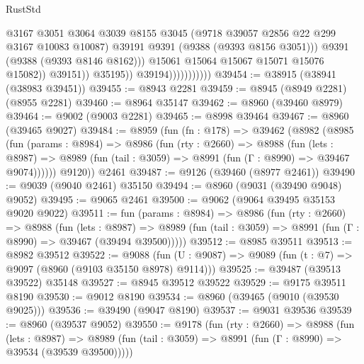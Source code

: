 \begin{lexlean}{RustStd}
\begin{coremodule}
                                          @3167
                                          @3051
                                          @3064
                                          @3039
                                          @8155
                                          @3045
                                          (@9718 @39057 @2856 @22 @299 @3167 @10083 @10087)
                                          @39191
                                          @9391
                                          (@9388 (@9393 @8156 @3051)))
                                        @9391
                                        (@9388 (@9393 @8146 @8162)))
                                      @15061
                                      @15064
                                      @15067
                                      @15071
                                      @15076
                                      @15082))
                                  @39151))
                              @35195))
                          @39194)))))))))))
@39454 := @38915 (@38941 (@38983 @39451))
@39455 := @8943 @2281
@39459 := @8945 (@8949 @2281) (@8955 @2281)
@39460 := @8964 @35147
@39462 := @8960 (@39460 @8979)
@39464 := @9002 (@9003 @2281)
@39465 := @8998 @39464
@39467 := @8960 (@39465 @9027)
@39484 := @8959
    (fun (fn : @178) =>
    @39462
      (@8982
        (@8985
          (fun (params : @8984) =>
          @8986
            (fun (rty : @2660) =>
            @8988
              (fun (lets : @8987) =>
              @8989 (fun (tail : @3059) => @8991 (fun (Γ : @8990) => @39467 @9074))))))
        @9120))
    @2461
@39487 := @9126 (@39460 (@8977 @2461))
@39490 := @9039 (@9040 @2461) @35150
@39494 := @8960 (@9031 (@39490 @9048) @9052)
@39495 := @9065 @2461
@39500 := @9062 (@9064 @39495 @35153 @9020 @9022)
@39511 := fun (params : @8984) =>
  @8986
    (fun (rty : @2660) =>
    @8988
      (fun (lets : @8987) =>
      @8989 (fun (tail : @3059) => @8991 (fun (Γ : @8990) => @39467 (@39494 @39500)))))
@39512 := @8985 @39511
@39513 := @8982 @39512
@39522 := @9088
    (fun (U : @9087) => @9089 (fun (t : @7) => @9097 (@8960 (@9103 @35150 @8978) @9114)))
@39525 := @39487 (@39513 @39522) @35148
@39527 := @8945 @39512 @39522
@39529 := @9175 @39511 @8190
@39530 := @9012 @8190
@39534 := @8960 (@39465 (@9010 (@39530 @9025)))
@39536 := @39490 (@9047 @8190)
@39537 := @9031 @39536
@39539 := @8960 (@39537 @9052)
@39550 := @9178
    (fun (rty : @2660) =>
    @8988
      (fun (lets : @8987) =>
      @8989 (fun (tail : @3059) => @8991 (fun (Γ : @8990) => @39534 (@39539 @39500)))))

\end{coremodule}
\end{lexlean}
